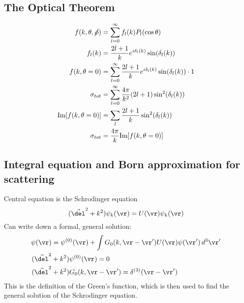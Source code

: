 \documentclass[a4paper, 11pt, normalem]{report}
\begin{document}
\section{The Optical Theorem}
\begin{align} 
    f(k,\theta,\cancel{\phi}) &= \sum_{l=0}^\infty f_l(k)P_l(\cos\theta) \\
    f_l(k) &= \frac{2l+1}{k}e^{i\delta_l(k)}\sin(\delta_l(k)) \\
    f(k,\theta=0) &= \sum_{l=0}^\infty \frac{2l+1}{k} e^{i\delta_l(k)}\sin(\delta_l(k))\cdot 1 \\
    \sigma_{tot} &= \sum_{l=0}^\infty \frac{4\pi}{k^2}(2l+1)\sin^2(\delta_l(k)) \\
    \text{Im}[f(k,\theta=0)] &= \sum_l \frac{2l+1}{k}\sin^2(\delta_l(k)) \\
    \sigma_{tot} &= \frac{4\pi}{k}\text{Im}[f(k,\theta=0)]
\end{align}

\section{Integral equation and Born approximation for scattering}
Central equation is the Schrodinger equation
\begin{equation}
    (\vec{\del}^2 + k^2)\psi_k(\vr) = U(\vr)\psi_k(\vr)
\end{equation}
Can write down a formal, general solution:
\begin{align}
    \psi(\vr) &= \psi^{(0)}(\vr) + \int G_0(k,\vr-\vr') U(\vr)\psi(\vr')\, d^3\vr' \\
    (\vec{\del}^2 &+ k^2)\psi^{(0)}(\vr) = 0 \\
    (\vec{\del}^2 &+ k^2)G_0(k,\vr-\vr') = \delta^{(3)}(\vr-\vr')
\end{align}
This is the definition of the Green's function, which is then used to find the general solution of the Schrodinger equation.

\chapter{}
\end{document}
